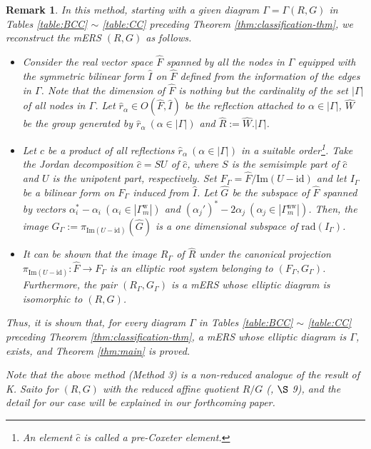 \documentclass[11pt]{amsart}
\newcommand{\w}{\mathrm{w}}
\newcommand{\nw}{\mathrm{nw}}
\newtheorem{rem}[thm]{Remark}%
\begin{document}
{\begin{rem}
{In this method, starting with a given diagram $\Gamma=\Gamma(R,G)$ in Tables 
\ref{table:BCC} $\sim$ \ref{table:CC} preceding Theorem \ref{thm:classification-thm},
we reconstruct the mERS $(R,G)$ as follows.
\begin{itemize}
\item[1.] Consider the real vector space $\widehat{F}$ spanned by all the nodes in 
$\Gamma$ equipped with the symmetric bilinear form $\widehat{I}$ on $\widehat{F}$
defined from the information of the edges in $\Gamma$. 
Note that the dimension of $\widehat{F}$ is nothing but the cardinality of the set 
$|\Gamma|$ of all nodes in $\Gamma$. 
Let $\hat{r}_\alpha\in O(\widehat{F},\widehat{I})$ be the reflection attached
to $\alpha\in |\Gamma|$, $\widehat{W}$ be the group generated by 
$\hat{r}_\alpha\ (\alpha\in |\Gamma|)$ and $\widehat{R}:=\widehat{W}.|\Gamma|$. 
\item[2.] Let $\hat{c}$ be a product of all reflections 
$\hat{r}_\alpha\ (\alpha\in |\Gamma|)$ in a suitable order\footnote{An element
$\hat{c}$ is called a {\it pre-Coxeter element}.}.  Take the Jordan decomposition 
$\hat{c}=SU$ of $\hat{c}$, 
where $S$ is the semisimple part of $\hat{c}$ and $U$ is the unipotent part, 
respectively. Set 
$F_{\Gamma}=\widehat{F}/ \mathrm{Im}(U-\mathrm{id})$ and let $I_\Gamma$
be a bilinear form on $F_\Gamma$ induced from $\widehat{I}$. 
Let $\widehat{G}$ be the subspace of $\widehat{F}$ spanned by vectors 
$\alpha_i^\ast-\alpha_i\ (\alpha_i\in |\Gamma_m^\w|)$ and 
$(\alpha_j')^\ast-2\alpha_j\ (\alpha_j\in |\Gamma_m^\nw|)$. Then, 
the image $G_\Gamma:=\pi_{\mathrm{Im}(U-\mathrm{id})}(\widehat{G})$ is 
a one dimensional subspace of $\mathrm{rad}(I_\Gamma)$. 
\item[3.] 
It can be shown that the image
$R_\Gamma$ of $\widehat{R}$ under the canonical projection 
$\pi_{\mathrm{Im}(U-\mathrm{id})}:\widehat{F}\to F_\Gamma$ 
is an elliptic root system belonging to $(F_\Gamma,G_\Gamma)$.
Furthermore, the pair $(R_\Gamma,G_\Gamma)$ is
a mERS whose elliptic diagram is isomorphic to $(R,G)$.
\end{itemize}
Thus, it is shown that, for every diagram $\Gamma$ in Tables \ref{table:BCC} 
$\sim$ \ref{table:CC} preceding Theorem \ref{thm:classification-thm}, a mERS whose 
elliptic diagram is $\Gamma$, exists, and 
Theorem \ref{thm:main} is proved.

Note that the above method (Method 3) is a non-reduced analogue of the result of 
K. Saito for $(R,G)$ with the reduced affine quotient $R/G$ (\cite{Saito1985}, $\S$ 9), 
and the detail for our case will be explained in our forthcoming paper. 
}
\end{rem}
\vskip 5mm
}
\end{document}
